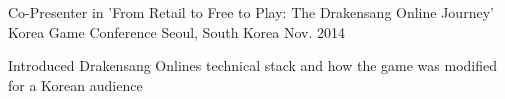 

\begin{cventries}

  \cventry
    {Co-Presenter in 'From Retail to Free to Play: The Drakensang Online Journey'} %
    {Korea Game Conference} %
    {Seoul, South Korea} %
    {Nov. 2014} %
    {
      \begin{cvitems} %
        \item {Introduced Drakensang Onlines technical stack and how the game was modified for a Korean audience}
      \end{cvitems}
    }

\end{cventries}
